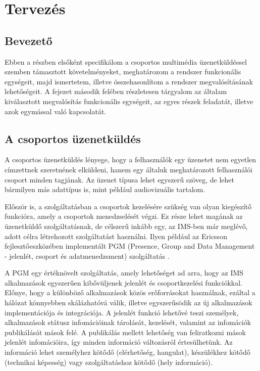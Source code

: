 \setcounter{tocdepth}{5}

\section{Tervezés}
\label{sec:tervezes}

\subsection{Bevezető}

Ebben a részben elsőként specifikálom a csoportos multimédia üzenetküldéssel szemben támasztott követelményeket, meghatározom a rendszer funkcionális egységeit, majd ismertetem, illetve összehasonlítom a rendszer megvalósításának lehetőségeit. A fejezet második felében részletesen tárgyalom az általam kiválasztott megvalósítás funkcionális egységeit, az egyes részek feladatát, illetve azok egymással való kapcsolatát.

\subsection{A csoportos üzenetküldés}
\label{sec:group_messaging}

A csoportos üzenetküldés lényege, hogy a felhasználók egy üzenetet nem egyetlen címzettnek szeretnének elküldeni, hanem egy általuk meghatározott felhasználói csoport minden tagjának. Az üzenet típusa lehet egyszerű szöveg, de lehet bármilyen más adattípus is, mint például audiovizuális tartalom. 

Először is, a szolgáltatásban a csoportok kezelésére szükség van olyan kiegészítő funkcióra, amely a csoportok menedzselését végzi. Ez része lehet magának az üzenetküldő szolgáltatásnak, de célszerű inkább egy, az IMS-ben már meglévő, adott célra létrehozott szolgáltatást használni. Ilyen például az Ericsson fejlesztőeszközében implementált PGM (Presence, Group and Data Management - jelenlét, csoport és adatmenedzsment) szolgáltatás \cite{ericsson_pgm}.

A PGM egy értéknövelt szolgáltatás, amely lehetőséget ad arra, hogy az IMS alkalmazások egyszerűen kibővüljenek jelenlét és csoportkezelési funkciókkal. Előnye, hogy a különböző alkalmazások közös erőforrásokat használnak, ezáltal a hálózat könnyebben skálázhatóvá válik, illetve egyszerűsödik az új alkalmazások implementációja és integrációja. A jelenlét funkció lehetővé teszi személyek, alkalmazások státusz infomációinak tárolását, kezelését, valamint az infomációk publikálását mások felé.
A publikálás mellett lehetőség van feliratkozni mások jelenlét infomációira, így minden információ változásról értesülhetünk. Az információ lehet személyhez kötődő (elérhetőség, hangulat), készülékhez kötődő (technikai képesség) vagy szolgáltatáshoz kötődő (hely információ).

